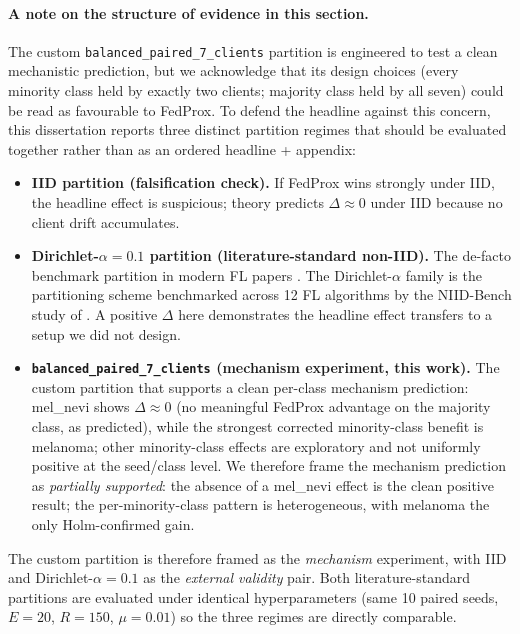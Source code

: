 \documentclass[11pt,a4paper]{article}
\begin{document}
\paragraph{A note on the structure of evidence in this section.}
The custom \texttt{balanced\_paired\_7\_clients} partition is engineered
to test a clean mechanistic prediction, but we acknowledge that its
design choices (every minority class held by exactly two clients;
majority class held by all seven) could be read as favourable to FedProx.
To defend the headline against this concern, this dissertation reports
three distinct partition regimes that should be evaluated together
rather than as an ordered headline + appendix:

\begin{itemize}
\item \textbf{IID partition (falsification check).} If FedProx wins
strongly under IID, the headline effect is suspicious; theory predicts
$\Delta \approx 0$ under IID because no client drift accumulates.
\item \textbf{Dirichlet-$\alpha = 0.1$ partition (literature-standard
non-IID).} The de-facto benchmark partition in modern FL papers
\citep{hsu2019dirichlet}.
The Dirichlet-$\alpha$ family is the partitioning scheme
benchmarked across 12 FL algorithms by the NIID-Bench study of
\citet{li2022niidbench}. A positive $\Delta$ here demonstrates the
headline effect transfers to a setup we did not design.
\item \textbf{\texttt{balanced\_paired\_7\_clients} (mechanism
experiment, this work).} The custom partition that supports a clean
per-class mechanism prediction: mel\_nevi shows $\Delta \approx 0$ (no
meaningful FedProx advantage on the majority class, as predicted), while
the strongest corrected minority-class benefit is melanoma; other
minority-class effects are exploratory and not uniformly positive at the
seed/class level. We therefore frame the mechanism prediction as
\emph{partially supported}: the absence of a mel\_nevi effect is the
clean positive result; the per-minority-class pattern is heterogeneous,
with melanoma the only Holm-confirmed gain.
\end{itemize}

The custom partition is therefore framed as the \emph{mechanism}
experiment, with IID and Dirichlet-$\alpha = 0.1$ as the \emph{external
validity} pair. Both literature-standard partitions are evaluated under
identical hyperparameters (same 10 paired seeds, $E = 20$, $R = 150$,
$\mu = 0.01$) so the three regimes are directly comparable.
\end{document}
